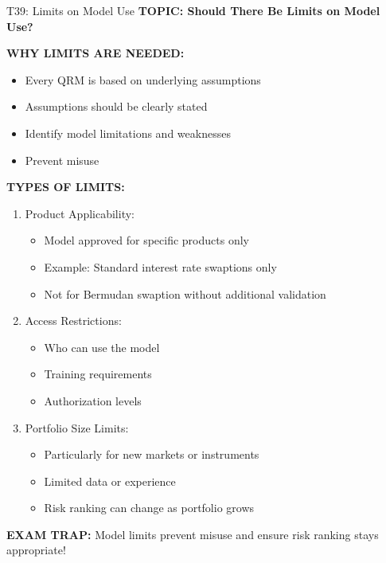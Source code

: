 \documentclass[8pt]{beamer}
\begin{document}
	\begin{frame}{T39: Limits on Model Use}
		\fontsize{6.5}{7.5}\selectfont
		\textbf{TOPIC: Should There Be Limits on Model Use?}
		
		\vspace{0.1cm}
		\textbf{WHY LIMITS ARE NEEDED:}
		\begin{itemize}
			\item Every QRM is based on underlying assumptions
			\item Assumptions should be clearly stated
			\item Identify model limitations and weaknesses
			\item Prevent misuse
		\end{itemize}
		
		\vspace{0.1cm}
		\textbf{TYPES OF LIMITS:}
		\begin{enumerate}
			\item \textcolor{myblue}{Product Applicability:}
			\begin{itemize}
				\item Model approved for specific products only
				\item Example: Standard interest rate swaptions only
				\item Not for Bermudan swaption without additional validation
			\end{itemize}
			\item \textcolor{myblue}{Access Restrictions:}
			\begin{itemize}
				\item Who can use the model
				\item Training requirements
				\item Authorization levels
			\end{itemize}
			\item \textcolor{myblue}{Portfolio Size Limits:}
			\begin{itemize}
				\item Particularly for new markets or instruments
				\item Limited data or experience
				\item Risk ranking can change as portfolio grows
			\end{itemize}
		\end{enumerate}
		
		\textcolor{myred}{\textbf{EXAM TRAP:}} Model limits prevent \textcolor{myblue}{misuse and ensure risk ranking stays appropriate}!
	\end{frame}
	
\end{document}
